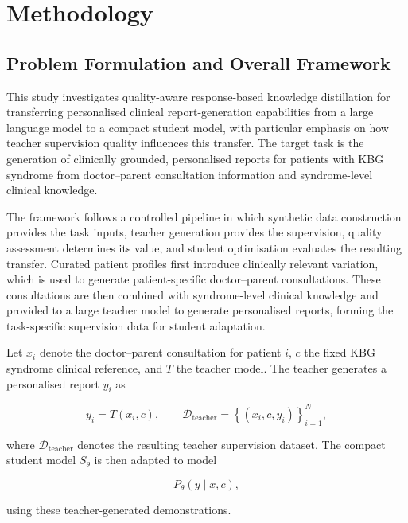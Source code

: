 \documentclass[ %
                    author={Aman Kumar Singh},
                supervisor={Dr. Edwin Simpson},
                    degree={MSc},
                     title={Quality-Aware Knowledge Distillation of Large Language Models for Efficient Personalised Clinical Report Generation},
                  subtitle={},
                      type={},
                      year={2021}]{dissertation}
\begin{document}
\chapter{Methodology}
\label{chap:execution}
\section{Problem Formulation and Overall Framework}
\label{sec:problem_formulation}
This study investigates quality-aware response-based knowledge distillation
for transferring personalised clinical report-generation capabilities from a
large language model to a compact student model, with particular emphasis
on how teacher supervision quality influences this transfer. The target task
is the generation of clinically grounded, personalised reports for patients
with KBG syndrome from doctor--parent consultation information and
syndrome-level clinical knowledge.

The framework follows a controlled pipeline in which synthetic data
construction provides the task inputs, teacher generation provides the
supervision, quality assessment determines its value, and student
optimisation evaluates the resulting transfer. Curated patient profiles
first introduce clinically relevant variation, which is used to generate
patient-specific doctor--parent consultations. These consultations are
then combined with syndrome-level clinical knowledge and provided to a
large teacher model to generate personalised reports, forming the
task-specific supervision data for student adaptation.

Let $x_i$ denote the doctor--parent consultation for patient $i$,
$c$ the fixed KBG syndrome clinical reference, and $T$ the teacher model.
The teacher generates a personalised report $y_i$ as

\begin{equation}
y_i = T(x_i,c),
\qquad
\mathcal{D}_{\mathrm{teacher}}
=
\left\{(x_i,c,y_i)\right\}_{i=1}^{N},
\end{equation}

where $\mathcal{D}_{\mathrm{teacher}}$ denotes the resulting teacher
supervision dataset. The compact student model $S_{\theta}$ is then adapted
to model

\begin{equation}
P_{\theta}(y\mid x,c),
\end{equation}

using these teacher-generated demonstrations.
\end{document}
